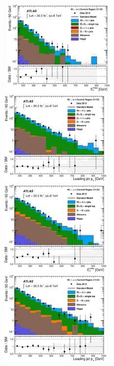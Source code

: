 \begin{figure}[!ht]
  \begin{center}
    \mbox{
      \includegraphics[width=0.495\textwidth]{Appendix_CharmTagged/Figures/can_VR_Wenu_C1_met_final.eps}
      \includegraphics[width=0.495\textwidth]{Appendix_CharmTagged/Figures/can_VR_Wenu_C1_jet1PtWithEle_final.eps}
    }
    \mbox{
      \includegraphics[width=0.495\textwidth]{Appendix_CharmTagged/Figures/can_VR_Wmunu_C1_metnomu_final.eps}
      \includegraphics[width=0.495\textwidth]{Appendix_CharmTagged/Figures/can_VR_Wmunu_C1_jet1Pt_final.eps}
}
\end{center}
\end{figure}
